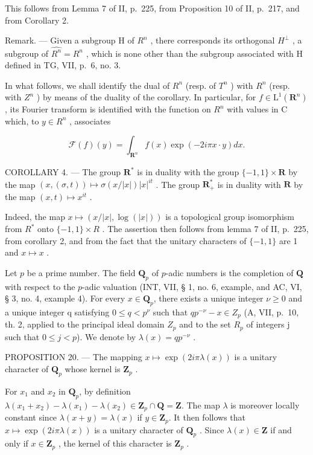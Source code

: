 This follows from Lemma 7 of II, p.~225, from Proposition 10 of II, p.~217, and from Corollary 2.

Remark. --- Given a subgroup H of \(R^{n}\) , there corresponds its orthogonal \(H^{\perp}\) , a subgroup of \(\widehat{R^{n}} = R^{n}\) , which is none other than the subgroup associated with H defined in TG, VII, p.~6, no. 3.

In what follows, we shall identify the dual of \(R^{n}\) (resp. of \(T^{n}\) ) with \(R^{n}\) (resp. with \(Z^{n}\) ) by means of the duality of the corollary. In particular, for \(f \in \mathrm{L}^{1}(\mathbf{R}^{n})\) , its Fourier transform is identified with the function on \(R^{n}\) with values in C which, to \(y \in R^{n}\) , associates

\[
\mathcal {F} (f) (y) = \int_ {\mathbf {R} ^ {n}} f (x) \exp (- 2 i \pi x \cdot y) d x.
\]

COROLLARY 4. --- The group \(\mathbf{R}^{*}\) is in duality with the group \(\{-1,1\} \times \mathbf{R}\) by the map \((x,(\sigma,t)) \mapsto \sigma(x/|x|)|x|^{it}\) . The group \(\mathbf{R}_{+}^{*}\) is in duality with \(\mathbf{R}\) by the map \((x,t) \mapsto x^{it}\) .

Indeed, the map \(x \mapsto (x/|x|, \log(|x|))\) is a topological group isomorphism from \(R^{*}\) onto \(\{-1, 1\} \times R\) . The assertion then follows from lemma 7 of II, p.~225, from corollary 2, and from the fact that the unitary characters of \(\{-1, 1\}\) are 1 and \(x \mapsto x\) .

Let \(p\) be a prime number. The field \(\mathbf{Q}_{p}\) of \(p\)-adic numbers is the completion of \(\mathbf{Q}\) with respect to the \(p\)-adic valuation (INT, VII, § 1, no. 6, example, and AC, VI, § 3, no. 4, example 4). For every \(x \in \mathbf{Q}_{p}\), there exists a unique integer \(\nu\geqslant0\) and a unique integer q satisfying \(0\leqslant q<p^{\nu}\) such that \(qp^{-\nu}-x\in Z_{p}\) (A, VII, p.~10, th. 2, applied to the principal ideal domain \(Z_{p}\) and to the set \(R_{p}\) of integers j such that \(0\leqslant j<p\)). We denote by \(\lambda(x)=qp^{-\nu}\) .

PROPOSITION 20. — The mapping \(x \mapsto \exp(2i\pi\lambda(x))\) is a unitary character of \(\mathbf{Q}_{p}\) whose kernel is \(\mathbf{Z}_{p}\) .

For \(x_1\) and \(x_2\) in \(\mathbf{Q}_p\), by definition \(\lambda(x_1 + x_2) - \lambda(x_1) - \lambda(x_2) \in \mathbf{Z}_p \cap \mathbf{Q} = \mathbf{Z}\). The map \(\lambda\) is moreover locally constant since \(\lambda(x + y) = \lambda(x)\) if \(y \in \mathbf{Z}_p\). It then follows that \(x \mapsto \exp(2i\pi\lambda(x))\) is a unitary character of \(\mathbf{Q}_p\) . Since \(\lambda(x) \in \mathbf{Z}\) if and only if \(x \in \mathbf{Z}_p\) , the kernel of this character is \(\mathbf{Z}_p\) .


